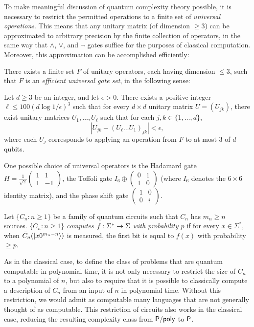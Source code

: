 To make meaningful discussion of quantum complexity theory possible, it is 
necessary to restrict the permitted operations to a finite set of 
\textit{universal operations}. This means that any unitary matrix (of dimension 
$\geq 3$) can be approximated to arbitrary precision by the finite collection of
operators, in the same way that $\wedge$, $\vee$, and $\neg$ gates suffice for 
the purposes of classical computation. Moreover, this approximation can be 
accomplished efficiently:
\begin{theorem}
There exists a finite set $F$ of unitary operators, each having dimension $\leq 
3$, such that $F$ is an \textit{efficient universal gate set}, in the following 
sense:

Let $d\geq 3$ be an integer, and let $\epsilon>0$. There exists a positive 
integer $\ell\leq 100(d\log 1/\epsilon)^3$ such that for every $d\times d$ 
unitary matrix $U=(U_{jk})$, there exist unitary matrices $U_1,\ldots,U_\ell$ 
such that for each $j,k\in\{1,\ldots,d\}$,
\[
|U_{jk}-(U_\ell\ldots U_1)_{jk}|<\epsilon,
\]
where each $U_j$ corresponds to applying an operation from $F$ to at most 3 of 
$d$ qubits.
\end{theorem}
One possible choice of universal operators is the Hadamard gate
$H=\frac{1}{\sqrt{2}}\left(\begin{smallmatrix}
1 & 1 \\ 1 & -1\end{smallmatrix}\right)$,
the Toffoli gate 
$I_6\oplus\left(\begin{smallmatrix}
0 & 1 \\ 1 & 0\end{smallmatrix}\right)$
(where $I_6$ denotes the $6\times 6$ identity matrix), and the phase shift gate
$\left(\begin{smallmatrix}
1 & 0 \\ 0 & i\end{smallmatrix}\right)$.

\begin{definition}
Let $\{C_n:n\geq 1\}$ be a family of quantum circuits such that $C_n$ has
$m_n\geq n$ sources. $\{C_n:n\geq 1\}$ \textit{computes $f:\Sigma^*\rightarrow\Sigma$
with probability $p$} if for every $x\in\Sigma^*$, when $\bar
C_n(|x0^{m_n-n}\rangle)$ is measured, the first bit is equal to $f(x)$ with
probability $\geq p$.
\end{definition}

As in the classical case, to define the class of problems that are quantum
computable in polynomial time, it is not only necessary to restrict the size of
$C_n$ to a polynomial of $n$, but also to require that it is possible to
classically compute a description of $C_n$ from an input of $n$ in
polynomial time. Without this restriction, we would admit as computable many
languages that are not generally thought of as computable. This restriction of
circuits also works in the classical case, reducing the resulting complexity
class from $\mathsf{P}/\mathsf{poly}$ to $\mathsf{P}$.

